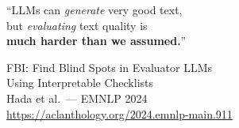 \documentclass[aspectratio=169,10pt]{beamer}
\newcommand{\fbi}{\textsc{FBI}}
\begin{document}
{
\begin{frame}
  \centering
  \vspace{1em}
  \Large
  ``LLMs can \emph{generate} very good text,\\
  but \emph{evaluating} text quality is\\
  \textbf{much harder than we assumed.}''

  \vspace{1.5em}
  \normalsize
  \fbi{}: Find Blind Spots in Evaluator LLMs\\
  Using Interpretable Checklists\\[0.5em]
  \small Hada et al.\ — EMNLP 2024\\
  \url{https://aclanthology.org/2024.emnlp-main.911}
\end{frame}
}

\end{document}
